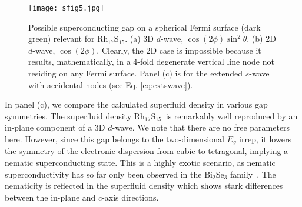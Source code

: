 \documentclass[aps,pra,reprint,superscriptaddress,floatfix]{revtex4-2}
\newcommand{\rhs}{Rh$_{17}$S$_{15}$}
\begin{document}
\begin{figure}
\texttt{[image: sfig5.jpg]}%
\caption{\label{sfig5} Possible superconducting gap on a spherical Fermi surface (dark green) relevant for Rh$_{17}$S$_{15}$. (a) 3D $d$-wave, $\cos(2\phi)\sin^2\theta$. (b) 2D $d$-wave, $\cos(2\phi)$. Clearly, the 2D case is impossible because it results, mathematically, in a 4-fold degenerate vertical line node not residing on any Fermi surface. Panel (c) is for the extended $s$-wave with accidental nodes (see Eq. \ref{eq:extswave}).}
\end{figure}

In panel (c), we compare the calculated superfluid density in various gap symmetries. The superfluid density \rhs~is remarkably well reproduced by an in-plane component of a 3D $d$-wave. We note that there are no free parameters here. However, since this gap belongs to the two-dimensional $E_g$ irrep, it lowers the symmetry of the electronic dispersion from cubic to tetragonal, implying a nematic superconducting state. This is a highly exotic scenario, as nematic superconductivity has so far only been observed in the Bi$_2$Se$_3$ family~\cite{Matano2016}. The nematicity is reflected in the superfluid density which shows stark differences between the in-plane and $c$-axis directions. 
\end{document}
